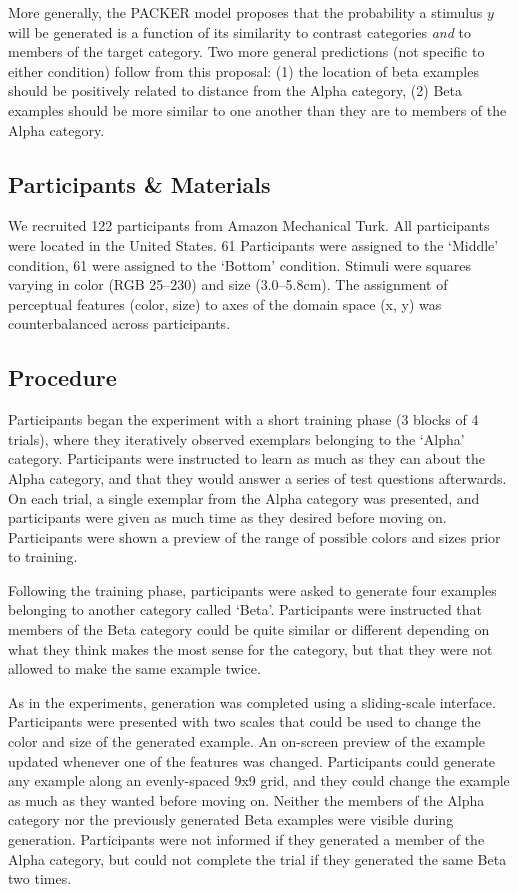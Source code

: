 \documentclass[10pt,letterpaper]{article}
\begin{document}
More generally, the PACKER model proposes that the probability a stimulus $y$ will be generated is a function of its similarity to contrast categories \textit{and} to members of the target category. Two more general predictions (not specific to either condition) follow from this proposal: (1) the location of beta examples should be positively related to distance from the Alpha category, (2) Beta examples should be more similar to one another than they are to members of the Alpha category.



\subsection{Participants \& Materials}

We recruited 122 participants from Amazon Mechanical Turk. All participants were located in the United States. 61 Participants were assigned to the `Middle' condition, 61 were assigned to the `Bottom' condition. Stimuli were squares varying in color (RGB 25--230) and size (3.0--5.8cm). The assignment of perceptual features (color, size) to axes of the domain space (x, y) was counterbalanced across participants.

\subsection{Procedure}

Participants began the experiment with a short training phase (3 blocks of 4 trials), where they iteratively observed exemplars belonging to the `Alpha' category. Participants were instructed to learn as much as they can about the Alpha category, and that they would answer a series of test questions afterwards. On each trial, a single exemplar from the Alpha category was presented, and participants were given as much time as they desired before moving on. Participants were shown a preview of the range of possible colors and sizes prior to training.

Following the training phase, participants were asked to generate four examples belonging to another category called `Beta'. Participants were instructed that members of the Beta category could be quite similar or different depending on what they think makes the most sense for the category, but that they were not allowed to make the same example twice. 

As in the \citet{jern2013probabilistic} experiments, generation was completed using a sliding-scale interface. Participants were presented with two scales that could be used to change the color and size of the generated example. An on-screen preview of the example updated whenever one of the features was changed. Participants could generate any example along an evenly-spaced 9x9 grid, and they could change the example as much as they wanted before moving on. Neither the members of the Alpha category nor the previously generated Beta examples were visible during generation. Participants were not informed if they generated a member of the Alpha category, but could not complete the trial if they generated the same Beta two times.
\end{document}
